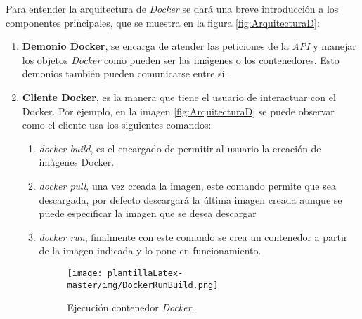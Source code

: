 Para entender la arquitectura de \textit{Docker} se dará una breve introducción a los componentes principales, que se muestra en la figura \ref{fig:ArquitecturaD}:
\begin{enumerate}
    \item \textbf{Demonio Docker}, se encarga de atender las peticiones de la \textit{API} y manejar los objetos \textit{Docker} como pueden ser las imágenes o los contenedores. Esto demonios también pueden comunicarse entre sí.
    \item \textbf{Cliente Docker}, es la manera que tiene el usuario de interactuar con el Docker. Por ejemplo, en la imagen \ref{fig:ArquitecturaD} se puede observar como el cliente usa los siguientes comandos:
    \begin{enumerate}
        \item \textit{docker build}, es el encargado de permitir al usuario la creación de imágenes Docker.
        \item \textit{docker pull}, una vez creada la imagen, este comando permite que sea descargada, por defecto descargará la última imagen creada aunque se puede especificar la imagen que se desea descargar
        \item \textit{docker run}, finalmente con este comando se crea un contenedor a partir de la imagen indicada y lo pone en funcionamiento.

\begin{figure}[H]
    \centering
    \texttt{[image: plantillaLatex-master/img/DockerRunBuild.png]}
    \caption{Ejecución contenedor \textit{Docker}.}
\end{figure}


\end{enumerate}
\end{enumerate}
